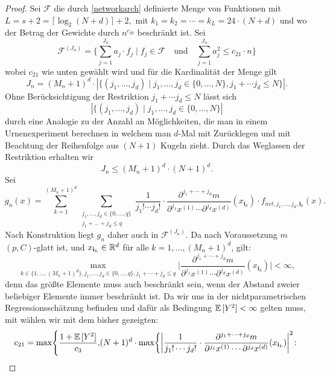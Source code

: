 \begin{proof}
Sei $\mathcal{F}$ die durch \ref{networkarch} definierte Menge von Funktionen mit $L = s + 2 = \lceil\log_2(N + d)\rceil + 2,$ mit $k_1 = k_2 = \cdots = k_L = 24 \cdot (N + d)$ und wo der Betrag der Gewichte durch $n^{c_{20}}$ beschränkt ist. Sei 
$$ \mathcal{F}^{(J_n)} = \biggl\{\sum_{j = 1}^{J_n} a_j \cdot f_j \mid f_j \in \mathcal{F} \quad \text{und} \quad \sum_{j = 1}^{J_n} a_j^2 \leq c_{21} \cdot n \biggr\}$$
wobei $c_{21}$ wie unten gewählt wird und für die Kardinalität der Menge gilt 
$$J_n = (M_n + 1)^d \cdot |\{(j_1,\dots,j_d) \mid j_1,\dots,j_d \in \{0,\dots,N\}, j_1 + \cdots j_d \leq N\}|.$$ 
Ohne Berücksichtigung der Restriktion $j_1 + \cdots j_d \leq N$ lässt sich $$|\{(j_1,\dots,j_d) \mid j_1,\dots,j_d \in \{0,\dots,N\}|$$ durch eine Analogie zu der Anzahl an Möglichkeiten, die man in einem Urnenexperiment berechnen in welchem man $d$-Mal mit Zurücklegen und mit Beachtung der Reihenfolge aus $(N + 1)$ Kugeln zieht. Durch das Weglassen der Restriktion erhalten wir 
\begin{equation}
\label{jn}
J_n \leq (M_n + 1)^d \cdot (N + 1)^d.
\end{equation}
Sei 
$$g_n(x) = \sum_{k = 1}^{(M_n + 1)^d} \sum_{\substack{ j_1,\dots,j_d \in \{0,\dots,q\} \\j_1+\dots +j_d \leq q}} \frac{1}{j_1! \cdots j_d!} \cdot \frac{\partial^{j_1+\cdots + j_d} m}{\partial^{j_1} x^{(1)}\cdots \partial^{j_d} x^{(d)}}(x_{\mathbf{i}_k}) \cdot f_{net,j_1,\dots,j_d,\mathbf{i}_k}(x).$$
Nach Konstruktion liegt $g_n$ daher auch in $\mathcal{F}^{(J_n)}.$
Da nach Voraussetzung $m$ $(p,C)$-glatt ist, und $x_{\mathbf{i}_k} \in \mathbb{R}^d$ für alle $k = 1,\dots,(M_n + 1)^d$, gilt$\colon$
\begin{equation}
\label{bound}
\max_{k \in \{1,\dots,(M_n + 1)^d\}, j_1,\dots,j_d \in\{0,\dots,q\}, j_1+\cdots+j_d \leq q} \bigg| \frac{\partial^{j_1+\cdots + j_d} m}{\partial^{j_1} x^{(1)}\cdots \partial^{j_d} x^{(d)}}(x_{\mathbf{i}_k})\bigg| < \infty,
\end{equation}
denn das größte Elemente muss auch beschränkt sein, wenn der Abstand zweier beliebiger Elemente immer beschränkt ist.
Da wir uns in der nichtparametrischen Regressionsschätzung befinden und dafür als Bedingung $\mathbb{E}\,[Y^2] < \infty$ gelten muss, mit wählen wir mit dem bisher gezeigten$\colon$
\begin{equation}
\label{constantc21}
\begin{split}
c_{21} = \max\Biggl\{\frac{1 + \E[Y^2]}{c_3}, & (N + 1)^d \cdot \max\biggl\{\bigg| \frac{1}{j_1! \cdots j_d!} \cdot \frac{\partial^{j_1+\cdots + j_d} m}{\partial^{j_1} x^{(1)}\cdots \partial^{j_d} x^{(d)}}(x_{\mathbf{i}_k})\bigg|^2 \colon \\

\end{split}
\end{equation}
\end{proof}
